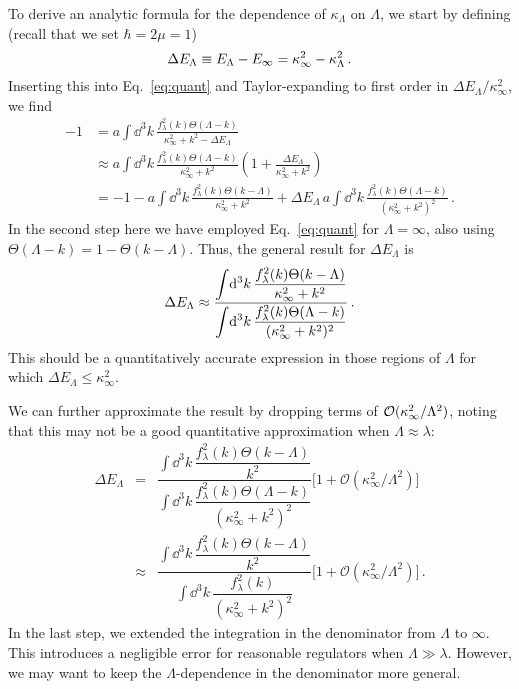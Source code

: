 	To derive an analytic formula for the dependence of $\kappa_\Lambda$
	on $\Lambda$, we start by defining (recall that we set $\hbar=2\mu=1$)
	\begin{equation}
	\Delta E_{\Lambda} \equiv E_\Lambda - E_{\infty} =
	\kappa_{\infty}^2 - \kappa_\Lambda^2 \,.
	\end{equation}
	Inserting this into Eq.~\eqref{eq:quant} and Taylor-expanding to first order
	in $\Delta E_{\Lambda}/\kappa_\infty^2$, we find
	\begin{align}
	 -1 &= a \int\! \dd^3k\,
	 \frac{f^2_\lambda(k)\Theta(\Lambda-k)}
	 {\kappa^2_\infty+k^2-\Delta E_{\Lambda}} \nonumber \\
	 &\approx
	 a\int\! \dd^3 k\,
	 \frac{f^2_\lambda(k)\Theta(\Lambda-k)}{\kappa^2_\infty+k^2}
	 \left(1+{\frac{\Delta E_{\Lambda}}{\kappa_\infty^2+k^2}}\right)
	 \nonumber \\
	 &= -1 - a \int\! \dd^3k\,
	 \frac{f^2_\lambda(k)\Theta(k-\Lambda)}{\kappa^2_\infty+k^2}
	 + \Delta E_{\Lambda} \, a\int\! \dd^3k\,
	 \frac{f^2_\lambda(k)\Theta(\Lambda-k)}{(\kappa^2_\infty+k^2)^2} \,.
	\end{align}
	In the second step here we have employed Eq.~\eqref{eq:quant} for
	$\Lambda=\infty$, also using $\Theta(\Lambda-k) = 1 - \Theta(k-\Lambda)$.
	Thus, the general result for $\Delta E_{\Lambda}$ is
	\begin{equation}
	 \Delta E_{\Lambda} \approx
	 \dfrac{\displaystyle\int\!\mathrm{d}^3 k\,
	     \dfrac{f^2_\lambda(k)\Theta(k-\Lambda)}{\kappa_{\infty}^2 + k^2}
	 }
	 {\displaystyle\int\!\mathrm{d}^3 k\,
	     \dfrac{f^2_\lambda(k)\Theta(\Lambda-k)}{(\kappa^2_\infty+k^2)^2}} \,.
	\label{eq:deltaE}
	\end{equation}
	This should be a quantitatively accurate expression in those regions
	of $\Lambda$ for which $\Delta E_{\Lambda} \le \kappa_\infty^2$.

	We can further approximate the result by dropping terms of
	$\mathcal{O}(\kappa_{\infty}^2/\Lambda^2)$, noting that this may not be a good
	quantitative approximation when $\Lambda \approx \lambda$:
	\begin{eqnarray}
	 \Delta E_{\Lambda} &=&
	 \dfrac{\displaystyle\int\!\dd^3 k\,
	   \dfrac{f^2_\lambda(k)\Theta(k-\Lambda)}{k^2}}
	 {\displaystyle\int\! \dd^3 k\,
	   \dfrac{f^2_\lambda(k)\Theta(\Lambda-k)}{(\kappa^2_\infty+k^2)^2}}
	   \Big[1+ {\mathcal O}(\kappa_\infty^2/\Lambda^2)\Big]
	   \nonumber\\
	 &\approx&
	   \dfrac{\displaystyle\int\!\dd^3 k\,
	     \dfrac{f^2_\lambda(k)\Theta(k-\Lambda)}{k^2}}
	 {\displaystyle\int\!\dd^3 k\,
	    \dfrac{f^2_\lambda(k)}{(\kappa^2_\infty+k^2)^2}}
	    \Big[1+ {\mathcal O}(\kappa_\infty^2/\Lambda^2)\Big]
	 \,.
	\label{eq:deltaEapprox}
	\end{eqnarray}
	In the last step, we extended the integration in the denominator from
	$\Lambda$ to $\infty$.  This introduces a negligible error for
	reasonable regulators when $\Lambda \gg \lambda$.  However, we may
	want to keep the $\Lambda$-dependence in the denominator more general.

